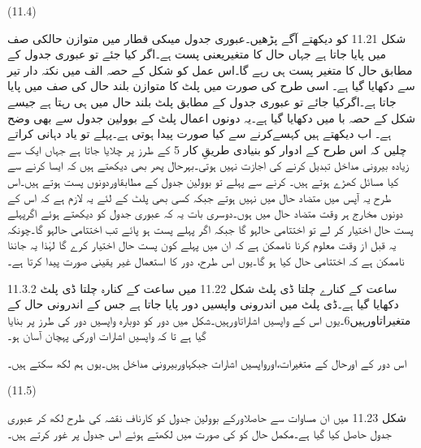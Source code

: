  
(11.4)
 
	شکل 11.21 کو دیکھتے آگے پڑھیں۔عبوری جدول میںکی قطار میں متوازن حالکی صف میں پایا جاتا ہے جہاں حال کا متغیریعنی پست ہے۔اگر کیا جئے تو عبوری جدول کے مطابق حال کا متغیر پست ہی رہے گا۔اس عمل کو شکل کے حصہ الف میں نکتہ دار تیر سے دکھایا گیا ہے۔
	اسی طرح  کی صورت میں پلٹ کا متوازن بلند حال  کی صف میں پایا جاتا ہے۔اگرکیا جائے تو عبوری جدول کے مطابق پلٹ بلند حال میں ہی رہتا ہے جیسے شکل کے حصہ با میں دکھایا گیا ہے۔یہ دونوں اعمال پلٹ کے بوولین جدول سے بھی وضح ہے۔
	اب دیکھتے ہیں کہسےکرنے سے کیا صورت پیدا ہوتی ہے۔پہلے تو یاد دہانی کراتے چلیں کہ اس طرح کے ادوار کو بنیادی طریقِ کار 5 کے طرز پر چلایا جاتا ہے جہاں ایک سے زیادہ بیرونی مداخل تبدیل کرنے کی اجازت نہیں ہوتی۔بہرحال پھر بھی دیکھتے ہیں کہ ایسا کرنے سے کیا مسائل کھڑے ہوتے ہیں۔
	کرنے سے پہلے تو بوولین جدول کے مطابقاوردونوں پست ہوتے ہیں۔اس طرح یہ آپس میں متضاد حال میں نہیں ہوتے جبکہ کسی بھی پلٹ کے لئے یہ لازم ہے کہ اس کے دونوں مخارج ہر وقت متضاد حال میں ہوں۔دوسری بات یہ کہ عبوری جدول کو دیکھتے ہوئے اگرپہلے پست حال اختیار کر لے تو اختتامی حالہو گا جبکہ اگر پہلے پست ہو پائے تب اختتامی حالہو گا۔چونکہ یہ قبل از وقت معلوم کرنا ناممکن ہے کہ ان میں پہلے کون پست حال اختیار کرے گا لہٰذا یہ جاننا ناممکن ہے کہ اختتامی حال کیا ہو گا۔یوں اس طرح، دور کا استعمال غیر یقینی صورت پیدا کرتا ہے۔

11.3.2 ساعت کے کنارے چلتا ڈی پلٹ
	شکل 11.22 میں ساعت کے کنارہ چلتا ڈی پلٹ دکھایا گیا ہے۔ڈی پلٹ میں اندرونی واپسیں دور پایا جاتا ہے جس کے اندرونی حال کے متغیراتاورہیں6۔یوں اس کے واپسیں اشاراتاورہیں۔شکل میں دور کو دوبارہ واپسیں دور کی طرز پر بنایا گیا ہے تا کہ واپسیں اشارات اورکی پہچان آسان ہو۔



	اس دور کے اورحال کے متغیرات،اورواپسیں اشارات  جبکہاوربیرونی مداخل ہیں۔یوں ہم لکھ سکتے ہیں۔

 
(11.5)

	شکل 11.23 میں ان مساوات سے حاصلاورکے بوولین جدول  کو کارناف نقشہ کی طرح لکھ کر عبوری جدول حاصل کیا گیا ہے۔مکمل حال کو کی صورت میں لکھتے ہوئے اس جدول پر غور کرتے ہیں۔


